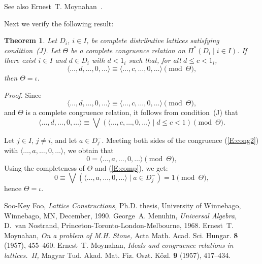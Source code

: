 \documentclass{article}
\newtheorem{theorem}{Theorem}
\begin{document}
See also Ernest~T. Moynahan~\cite{eM57a}.

Next we verify the following result:

\begin{theorem}\label{T:P*}
    Let $D_{i}$, $i \in I$, be complete distributive
   lattices satisfying condition~\textup{(J)}.  Let $\Theta$
   be a complete congruence relation on
   $\Pi^{*} ( D_{i} \mid i \in I )$.
   If there exist $i \in I$ and $d \in D_{i}$ with
   $d < 1_{i}$ such that, for all $d \leq c < 1_{i}$,
   \begin{equation}\label{E:cong1}
      \langle \ldots, d, \ldots, 0, \ldots \rangle \equiv
      \langle \ldots, c, \ldots, 0, \ldots \rangle \pmod{\Theta},
   \end{equation}
   then $\Theta = \iota$.
\end{theorem}

\emph{Proof.} Since
\begin{equation}\label{E:cong2}
   \langle \ldots, d, \ldots, 0, \ldots \rangle \equiv
   \langle \ldots, c, \ldots, 0, \ldots \rangle \pmod{\Theta},
\end{equation}
and $\Theta$ is a complete congruence relation, it follows
from condition~(J) that
\begin{equation}\label{E:cong}
    \langle \ldots, d, \ldots, 0, \ldots \rangle \equiv
    \bigvee ( \langle \ldots, c, \ldots, 0, \ldots \rangle
    \mid d \leq c < 1 ) \pmod{\Theta}.
\end{equation}

Let $j \in I$, $j \neq i$, and let $a \in D_{j}^{-}$.
Meeting both sides of the congruence (\ref{E:cong2}) with
$\langle \ldots, a, \ldots, 0, \ldots \rangle$, we obtain that
\begin{equation}\label{E:comp}
   0 = \langle \ldots, a, \ldots, 0, \ldots \rangle \pmod{\Theta},
\end{equation}
Using the completeness of $\Theta$ and (\ref{E:comp}),
we get:
\[
   0 \equiv \bigvee ( \langle \ldots, a, \ldots, 0, \ldots \rangle
   \mid a \in D_{j}^{-} ) = 1 \pmod{\Theta},
\]
hence $\Theta = \iota$.

\begin{thebibliography}{9}
      Soo-Key Foo,
      \emph{Lattice Constructions,}
      Ph.D. thesis,
      University of Winnebago, Winnebago, MN, December, 1990.
      George~A. Menuhin,
      \emph{Universal Algebra,}
      D.~van Nostrand, Princeton-Toronto-London-Melbourne, 1968.
      Ernest~T. Moynahan,
      \emph{On a problem of M.H. Stone,}
      Acta Math. Acad. Sci. Hungar. \textbf{8} (1957), 455--460.
      Ernest~T. Moynahan,
      \emph{Ideals and congruence relations in lattices.~II,}
      Magyar Tud. Akad. Mat. Fiz. Oszt. K\"{o}zl. \textbf{9}
      (1957), 417--434.
\end{thebibliography}
\end{document}
